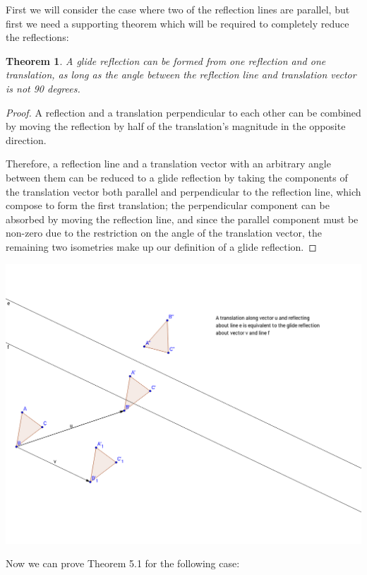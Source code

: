 \documentclass[11pt]{article}
\newtheorem{theorem}{Theorem}[section]
\theoremstyle{definition}
\begin{document}
First we will consider the case where two of the reflection lines are parallel,
but first we need a supporting theorem which will be required to completely
reduce the reflections:

\begin{theorem}\label{glide reflection from a reflection and a translation}
  A glide reflection can be formed from one reflection and one translation,
  as long as the angle between the reflection line and translation vector is
  not 90 degrees.
\end{theorem}

\begin{proof}
  A reflection and a translation perpendicular to each other can be combined by
  moving the reflection by half of the translation's magnitude in the opposite
  direction.

  Therefore, a reflection line and a translation vector with an arbitrary angle
  between them can be reduced to a glide reflection by taking the components of
  the translation vector both parallel and perpendicular to the reflection
  line, which compose to form the first translation; the perpendicular
  component can be absorbed by moving the reflection line, and since the
  parallel component must be non-zero due to the restriction on the angle of
  the translation vector, the remaining two isometries make up our definition
  of a glide reflection.
\end{proof}

\includegraphics[scale=.4]{glide}

Now we can prove Theorem 5.1 for the following case:
\end{document}

